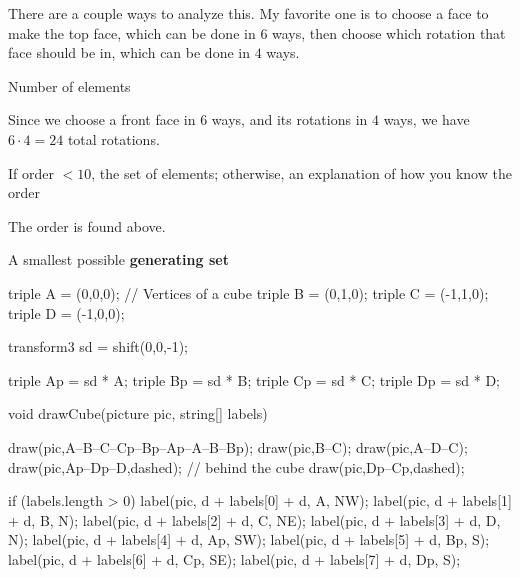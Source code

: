 \documentclass[../gatm_answers.tex]{subfiles}
\begin{document}
\noindent There are a couple ways to analyze this. My favorite one is to choose a face to make the top face, which can be done in $6$ ways, then choose which rotation that face should be in, which can be done in $4$ ways.

\begin{inner_problem}[start=1]
\item Number of elements
\end{inner_problem}

\noindent Since we choose a front face in $6$ ways, and its rotations in $4$ ways, we have $6\cdot 4=24$ total rotations.

\begin{inner_problem}
\item If order $< 10$, the set of elements; otherwise, an explanation of how you know the order
\end{inner_problem}

\noindent The order is found above.

\begin{inner_problem}
\item A smallest possible \textbf{generating set}
\end{inner_problem}

\begin{asydef}
triple A = (0,0,0); // Vertices of a cube
triple B = (0,1,0);
triple C = (-1,1,0);
triple D = (-1,0,0);

transform3 sd = shift(0,0,-1);

triple Ap = sd * A;
triple Bp = sd * B;
triple Cp = sd * C;
triple Dp = sd * D;

void drawCube(picture pic, string[] labels) {
    draw(pic,A--B--C--Cp--Bp--Ap--A--B--Bp);
    draw(pic,B--C);
    draw(pic,A--D--C);
    draw(pic,Ap--Dp--D,dashed); // behind the cube
    draw(pic,Dp--Cp,dashed);

    if (labels.length > 0) {
        label(pic, d + labels[0] + d, A, NW);
        label(pic, d + labels[1] + d, B, N);
        label(pic, d + labels[2] + d, C, NE);
        label(pic, d + labels[3] + d, D, N);
        label(pic, d + labels[4] + d, Ap, SW);
        label(pic, d + labels[5] + d, Bp, S);
        label(pic, d + labels[6] + d, Cp, SE);
        label(pic, d + labels[7] + d, Dp, S);
    }
}
\end{asydef}
\end{document}
